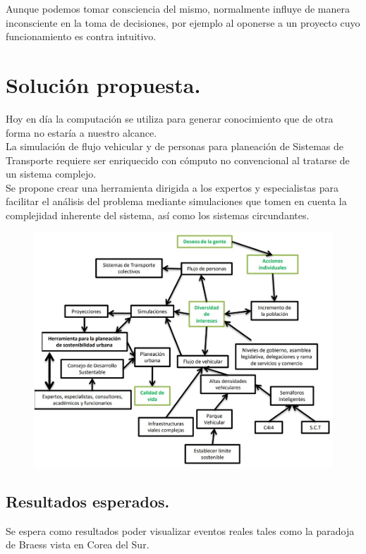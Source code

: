 \documentclass[10pt]{article}
\begin{document}
Aunque podemos tomar consciencia del mismo, normalmente influye de manera inconsciente en la toma de decisiones, por ejemplo al oponerse a un proyecto cuyo funcionamiento es contra intuitivo.

\section{ Solución propuesta.}
Hoy en día la computación se utiliza para generar conocimiento que de otra forma no estaría a nuestro alcance.  \\

La simulación de flujo vehicular y de personas para planeación de Sistemas de Transporte requiere ser enriquecido con cómputo no convencional al tratarse de un sistema complejo. \\

Se propone crear una herramienta dirigida a los expertos y especialistas para facilitar el análisis del problema mediante simulaciones que tomen en cuenta la complejidad inherente del sistema, así como los sistemas circundantes. \\

\begin{figure}[htbp!]
	\begin{center}
		\includegraphics[scale = 0.7]{Imagen/Simulaciones.jpg}
	\end{center}
\end{figure}

\newpage
\subsection{ Resultados esperados.}
Se espera como resultados poder visualizar eventos reales tales como la paradoja de Braess vista en Corea del Sur.\\
\end{document}
